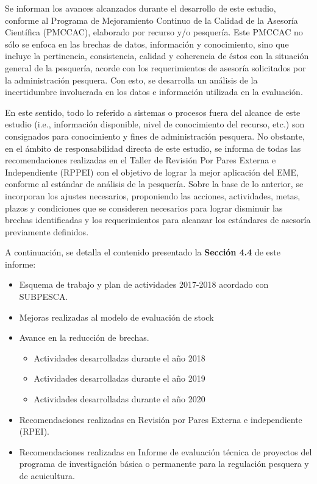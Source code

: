 \documentclass[
  spanish,
]{article}
\providecommand{\tightlist}{%
  \setlength{\itemsep}{0pt}\setlength{\parskip}{0pt}}
\begin{document}
Se informan los avances alcanzados durante el desarrollo de este
estudio, conforme al Programa de Mejoramiento Continuo de la Calidad de
la Asesoría Científica (PMCCAC), elaborado por recurso y/o pesquería.
Este PMCCAC no sólo se enfoca en las brechas de datos, información y
conocimiento, sino que incluye la pertinencia, consistencia, calidad y
coherencia de éstos con la situación general de la pesquería, acorde con
los requerimientos de asesoría solicitados por la administración
pesquera. Con esto, se desarrolla un análisis de la incertidumbre
involucrada en los datos e información utilizada en la evaluación.

En este sentido, todo lo referido a sistemas o procesos fuera del
alcance de este estudio (i.e., información disponible, nivel de
conocimiento del recurso, etc.) son consignados para conocimiento y
fines de administración pesquera. No obstante, en el ámbito de
responsabilidad directa de este estudio, se informa de todas las
recomendaciones realizadas en el Taller de Revisión Por Pares Externa e
Independiente (RPPEI) con el objetivo de lograr la mejor aplicación del
EME, conforme al estándar de análisis de la pesquería. Sobre la base de
lo anterior, se incorporan los ajustes necesarios, proponiendo las
acciones, actividades, metas, plazos y condiciones que se consideren
necesarios para lograr disminuir las brechas identificadas y los
requerimientos para alcanzar los estándares de asesoría previamente
definidos.

A continuación, se detalla el contenido presentado la \textbf{Sección
4.4} de este informe:

\begin{itemize}
\item
  Esquema de trabajo y plan de actividades 2017-2018 acordado con
  SUBPESCA.
\item
  Mejoras realizadas al modelo de evaluación de stock
\item
  Avance en la reducción de brechas.

  \begin{itemize}
  \tightlist
  \item
    Actividades desarrolladas durante el año 2018
  \item
    Actividades desarrolladas durante el año 2019
  \item
    Actividades desarrolladas durante el año 2020
  \end{itemize}
\item
  Recomendaciones realizadas en Revisión por Pares Externa e
  independiente (RPEI).
\item
  Recomendaciones realizadas en Informe de evaluación técnica de
  proyectos del programa de investigación básica o permanente para la
  regulación pesquera y de acuicultura.
\end{itemize}
\end{document}
